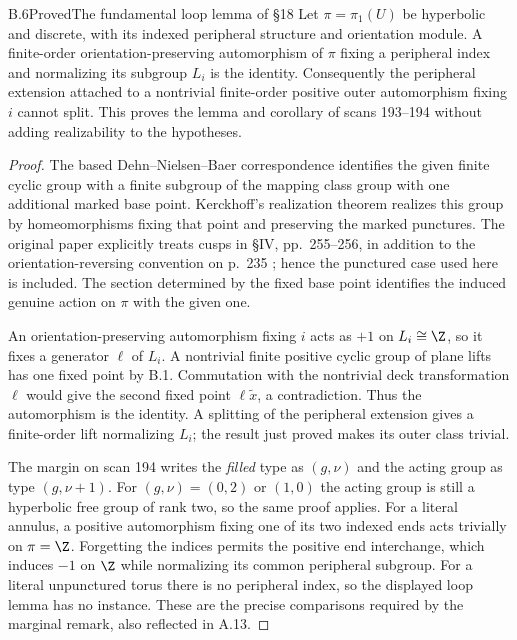\begin{claim}{B.6}{Proved}{The fundamental loop lemma of \S18}
Let $\pi=\pi_1(U)$ be hyperbolic and discrete, with its indexed peripheral
structure and orientation module. A finite-order orientation-preserving
automorphism of $\pi$ fixing a peripheral index and normalizing its subgroup
$L_i$ is the identity. Consequently the peripheral extension attached to a
nontrivial finite-order positive outer automorphism fixing $i$ cannot split.
This proves the lemma and corollary of scans 193--194 without adding realizability
to the hypotheses.
\end{claim}
\begin{proof}
The based Dehn--Nielsen--Baer correspondence identifies the given finite cyclic
group with a finite subgroup of the mapping class group with one additional
marked base point. Kerckhoff's realization theorem realizes this group by
homeomorphisms fixing that point and preserving the marked punctures. The
original paper explicitly treats cusps in \S IV, pp.~255--256, in addition to
the orientation-reversing convention on p.~235 \cite{bKerckhoff1983}; hence the
punctured case used here is included. The section determined by the fixed base
point identifies the induced genuine action on $\pi$ with the given one.

An orientation-preserving automorphism fixing $i$ acts as $+1$ on $L_i\cong\Z$,
so it fixes a generator $\ell$ of $L_i$. A nontrivial finite positive cyclic group
of plane lifts has one fixed point by B.1. Commutation with the nontrivial deck
transformation $\ell$ would give the second fixed point $\ell\widetilde x$,
a contradiction. Thus the automorphism is the identity. A splitting of the
peripheral extension gives a finite-order lift normalizing $L_i$; the result
just proved makes its outer class trivial.

The margin on scan 194 writes the \emph{filled} type as $(g,\nu)$ and the
acting group as type $(g,\nu+1)$. For $(g,\nu)=(0,2)$ or $(1,0)$ the acting
group is still a hyperbolic free group of rank two, so the same proof applies.
For a literal annulus, a positive automorphism fixing one of its two indexed
ends acts trivially on $\pi=\Z$. Forgetting the indices permits the positive
end interchange, which induces $-1$ on $\Z$ while normalizing its common
peripheral subgroup. For a literal unpunctured torus there is no peripheral
index, so the displayed loop lemma has no instance. These are the precise
comparisons required by the marginal remark, also reflected in A.13.
\end{proof}

